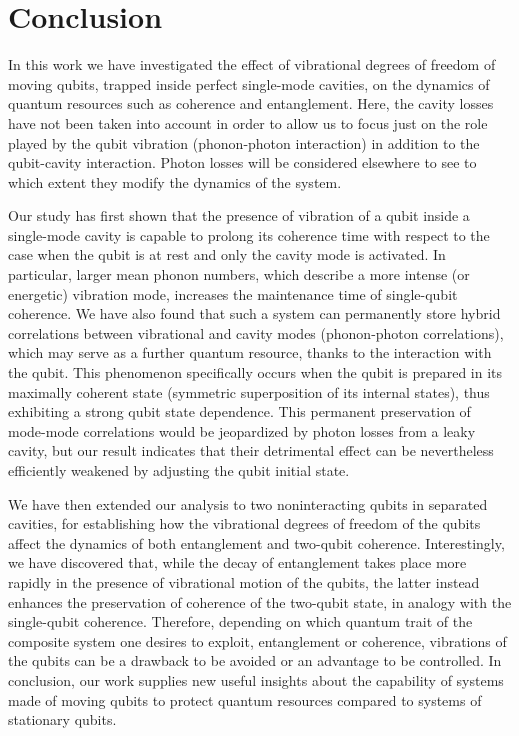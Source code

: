 \documentclass[twocolumn,3p,times]{elsarticle}
\begin{document}
\section{Conclusion}\label{sec4}
In this work we have investigated the effect of vibrational degrees of freedom of moving qubits, trapped inside perfect single-mode cavities, on the dynamics of quantum resources such as coherence and entanglement. Here, the cavity losses have not been taken into account in order to allow us to focus just on the role played by the qubit vibration (phonon-photon interaction) in addition to the qubit-cavity interaction. Photon losses will be considered elsewhere to see to which extent  they modify the dynamics of the system. 

Our study has first shown that the presence of vibration of a qubit inside a single-mode cavity is capable to prolong its coherence time with respect to the case when the qubit is at rest and only the cavity mode is activated. In particular, larger mean phonon numbers, which describe a more intense (or energetic) vibration mode, increases the maintenance time of single-qubit coherence. We have also found that such a system can permanently store hybrid correlations between vibrational and cavity modes (phonon-photon correlations), which may serve as a further quantum resource, thanks to the interaction with the qubit. This phenomenon specifically occurs when the qubit is prepared in its maximally coherent state (symmetric superposition of its internal states), thus exhibiting a strong qubit state dependence. This permanent preservation of mode-mode correlations would be jeopardized by photon losses from a leaky cavity, but our result indicates that their detrimental effect can be nevertheless efficiently weakened by adjusting the qubit initial state.  

We have then extended our analysis to two noninteracting qubits in separated cavities, for establishing how the vibrational degrees of freedom of the qubits affect the dynamics of both entanglement and two-qubit coherence. Interestingly, we have discovered that, while the decay of entanglement takes place more rapidly in the presence of vibrational motion of the qubits, the latter instead enhances the preservation of coherence of the two-qubit state, in analogy with the single-qubit coherence. Therefore, depending on which quantum trait of the composite system one desires to exploit, entanglement or coherence, vibrations of the qubits can be a drawback to be avoided or an advantage to be controlled. In conclusion, our work supplies new useful insights about the capability of systems made of moving qubits to protect quantum resources compared to systems of stationary qubits.
\end{document}
